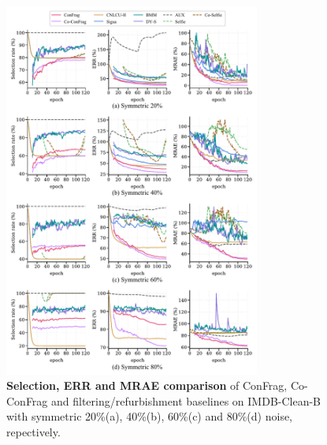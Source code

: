 \documentclass{article}
\theoremstyle{plain}
\theoremstyle{definition}
\theoremstyle{remark}
\begin{document}

\begin{figure}[th]
\begin{center}
\centerline{\includegraphics[width=0.75\textwidth]{imgs/selerr_comparison_supp1_neurips.pdf}}
\caption{\textbf{Selection, ERR and MRAE comparison} of ConFrag, Co-ConFrag and filtering/refurbishment baselines on IMDB-Clean-B
with symmetric 20\%(a), 40\%(b), 60\%(c) and 80\%(d) noise, repectively.
}
\label{fig:selerr_comparison_supp1}
\end{center}
\end{figure}
\end{document}
